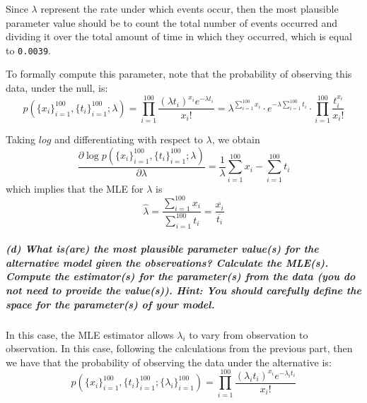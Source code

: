 \documentclass[11pt, english]{article}
\begin{document}
    Since \(\lambda\) represent the rate under which events occur, then the
most plausible parameter value should be to count the total number of
events occurred and dividing it over the total amount of time in which
they occurred, which is equal to \texttt{0.0039}.

    To formally compute this parameter, note that the probability of
observing this data, under the null, is:
\[p\left(\{x_i\}_{i=1}^{100},\{t_i\}_{i=1}^{100};\lambda\right) = \prod_{i=1}^{100} \frac{(\lambda t_i)^{x_i} e^{-\lambda t_i}}{x_i!} = \lambda^{\sum_{i=1}^{100} x_i} \cdot e^{-\lambda \sum_{i=1}^{100} t_i} \cdot \prod_{i=1}^{100} \frac{t_i^{x_i}}{x_i!} \]

Taking \(log\) and differentiating with respect to \(\lambda\), we
obtain
\[ \frac{\partial \log p\left(\{x_i\}_{i=1}^{100},\{t_i\}_{i=1}^{100};\lambda\right)}{\partial \lambda} = \frac{1}{\lambda}\sum_{i=1}^{100} x_i - \sum_{i=1}^{100} t_i \]
which implies that the MLE for \(\lambda\) is
\[\hat{\lambda} = \frac{\sum_{i=1}^{100} x_i}{\sum_{i=1}^{100} t_i} = \frac{\overline{x_i}}{\overline{t_i}}\]

    \hypertarget{d-what-isare-the-most-plausible-parameter-values-for-the-alternative-model-given-the-observations-calculate-the-mles.-compute-the-estimators-for-the-parameters-from-the-data-you-do-not-need-to-provide-the-values.-hint-you-should-carefully-define-the-space-for-the-parameters-of-your-model.}{%
\subparagraph{(d) What is(are) the most plausible parameter value(s) for
the alternative model given the observations? Calculate the MLE(s).
Compute the estimator(s) for the parameter(s) from the data (you do not
need to provide the value(s)). Hint: You should carefully define the
space for the parameter(s) of your
model.\\[2ex]}\label{d-what-isare-the-most-plausible-parameter-values-for-the-alternative-model-given-the-observations-calculate-the-mles.-compute-the-estimators-for-the-parameters-from-the-data-you-do-not-need-to-provide-the-values.-hint-you-should-carefully-define-the-space-for-the-parameters-of-your-model.}}

    In this case, the MLE estimator allows \(\lambda_i\) to vary from
observation to observation. In this case, following the calculations
from the previous part, then we have that the probability of observing
the data under the alternative is:
\[p\left(\{x_i\}_{i=1}^{100},\{t_i\}_{i=1}^{100};\{\lambda_i\}_{i=1}^{100}\right) = \prod_{i=1}^{100} \frac{(\lambda_i t_i)^{x_i} e^{-\lambda_i t_i}}{x_i!} \]
\end{document}
